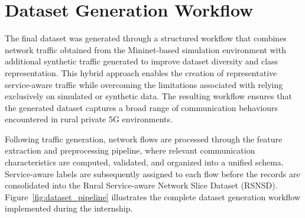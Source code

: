 \documentclass[12pt,a4paper]{report}
\begin{document}
	\section{Dataset Generation Workflow}
	\label{sec:dataset_pipeline}
	
	The final dataset was generated through a structured workflow that combines network traffic obtained from the Mininet-based simulation environment with additional synthetic traffic generated to improve dataset diversity and class representation. This hybrid approach enables the creation of representative service-aware traffic while overcoming the limitations associated with relying exclusively on simulated or synthetic data. The resulting workflow ensures that the generated dataset captures a broad range of communication behaviours encountered in rural private 5G environments.
	
	Following traffic generation, network flows are processed through the feature extraction and preprocessing pipeline, where relevant communication characteristics are computed, validated, and organized into a unified schema. Service-aware labels are subsequently assigned to each flow before the records are consolidated into the Rural Service-aware Network Slice Dataset (RSNSD). Figure~\ref{fig:dataset_pipeline} illustrates the complete dataset generation workflow implemented during the internship.
	
\end{document}
